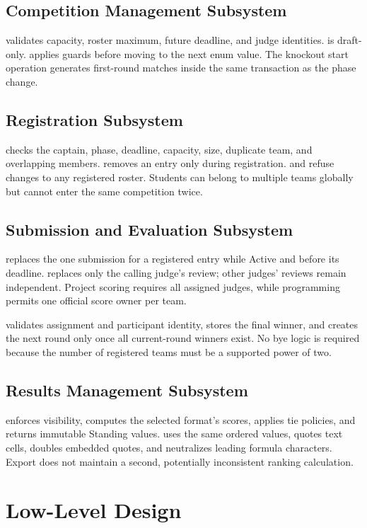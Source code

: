 \subsection{Competition Management Subsystem}
 validates capacity, roster maximum, future deadline, and judge identities.  is draft-only.  applies guards before moving to the next enum value. The knockout start operation generates first-round matches inside the same transaction as the phase change.
\subsection{Registration Subsystem}
 checks the captain, phase, deadline, capacity, size, duplicate team, and overlapping members.  removes an entry only during registration.  and  refuse changes to any registered roster. Students can belong to multiple teams globally but cannot enter the same competition twice.
\subsection{Submission and Evaluation Subsystem}
 replaces the one submission for a registered entry while Active and before its deadline.  replaces only the calling judge's review; other judges' reviews remain independent. Project scoring requires all assigned judges, while programming permits one official score owner per team.

 validates assignment and participant identity, stores the final winner, and creates the next round only once all current-round winners exist. No bye logic is required because the number of registered teams must be a supported power of two.
\subsection{Results Management Subsystem}
 enforces visibility, computes the selected format's scores, applies tie policies, and returns immutable Standing values.  uses the same ordered values, quotes text cells, doubles embedded quotes, and neutralizes leading formula characters. Export does not maintain a second, potentially inconsistent ranking calculation.

\clearpage\section{Low-Level Design}
